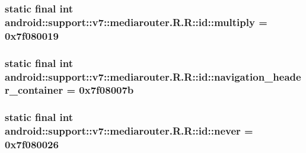 \hypertarget{classandroid_1_1support_1_1v7_1_1mediarouter_1_1_r_1_1id_4c50b285639a0f990e21c58281794702}{
\subsubsection[{multiply}]{\setlength{\rightskip}{0pt plus 5cm}static final int android::support::v7::mediarouter.R.R::id::multiply = 0x7f080019}}
\label{classandroid_1_1support_1_1v7_1_1mediarouter_1_1_r_1_1id_4c50b285639a0f990e21c58281794702}


\hypertarget{classandroid_1_1support_1_1v7_1_1mediarouter_1_1_r_1_1id_15b3d6da2c388a1443adc71f97182211}{
\subsubsection[{navigation\_\-header\_\-container}]{\setlength{\rightskip}{0pt plus 5cm}static final int android::support::v7::mediarouter.R.R::id::navigation\_\-header\_\-container = 0x7f08007b}}
\label{classandroid_1_1support_1_1v7_1_1mediarouter_1_1_r_1_1id_15b3d6da2c388a1443adc71f97182211}


\hypertarget{classandroid_1_1support_1_1v7_1_1mediarouter_1_1_r_1_1id_d28e09ad210bef8d6d7ea57d7292f15c}{
\subsubsection[{never}]{\setlength{\rightskip}{0pt plus 5cm}static final int android::support::v7::mediarouter.R.R::id::never = 0x7f080026}}
\label{classandroid_1_1support_1_1v7_1_1mediarouter_1_1_r_1_1id_d28e09ad210bef8d6d7ea57d7292f15c}


